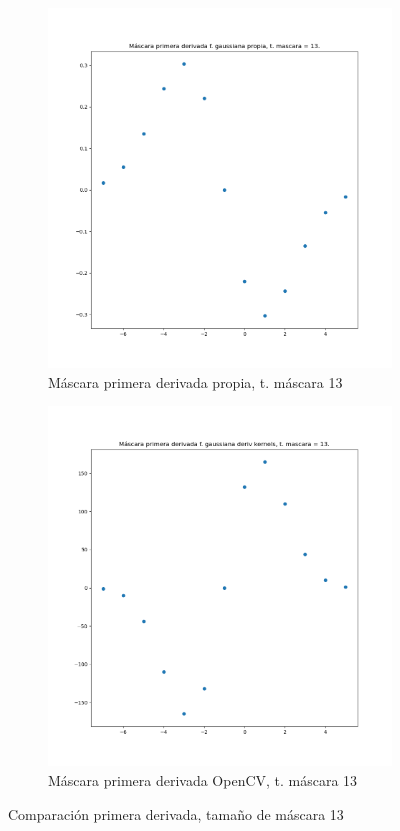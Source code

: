\documentclass[12pt, spanish]{article}
\begin{document}
\begin{figure}[H]
  \centering
	\begin{subfigure}[t]{0.4\textwidth}
		\centering
		\includegraphics[width = \textwidth]{cmp-p13.png}
 		 \caption{Máscara primera derivada propia, t. máscara 13}
	\end{subfigure}
	\hspace{1cm}
	\begin{subfigure}[t]{0.4\textwidth}
		\centering
		\includegraphics[width = \textwidth]{cmp-cv13.png}
 		 \caption{Máscara primera derivada OpenCV, t. máscara 13}
	\end{subfigure}
	\caption{Comparación primera derivada, tamaño de máscara 13}
  	\label{fig:ej1c5}
\end{figure}
\end{document}
